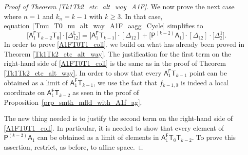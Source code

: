 \documentclass[pdftex]{sigma}
\numberwithin{equation}{section}
\begin{document}
\begin{proof}[Proof of Theorem \ref{Tk1Tk2_etc_alt_way_A1F}]
We now prove
the next case where $n = 1$ and $k_n = k-1$ with $k \geq 3$.
In that case, equation~\eqref{Tmu_T0_nu_alt_way_A1F_aagg_Cycle}
simplifies to
\begin{equation}\label{A1FT0T1_coll}
\bigl[\mathsf{A}_1^{\mathsf{F}} \mathsf{T}_{k-2}\mathsf{T}_{0}\bigr]
\cdot \bigl[\Delta_{12}^{\mathsf{L}}\bigr]
 =  \bigl[\mathsf{A}_1^{\mathsf{F}} \mathsf{T}_{k-1}\bigr]\cdot [\Delta_{12}] +
\bigl[\mathsf{P}^{(k-2)}\mathsf{A}_1\bigr]\cdot [\Delta_{12}] \cdot \bigl[\Delta_{2}^1\bigr].
\end{equation}
In order to prove \eqref{A1FT0T1_coll}, we
build on what has already been proved in Theorem \ref{Tk1Tk2_etc_alt_way}.
The justification for the first term on the right-hand side of
\eqref{A1FT0T1_coll} is the same as in the proof of Theorem \ref{Tk1Tk2_etc_alt_way}.
In order to show that every $\mathsf{A}_1^{\mathsf{F}}\mathsf{T}_{k-1}$ point can be
obtained as a limit of
$\mathsf{A}_1^{\mathsf{F}}\mathsf{T}_{k-1}$, we use the fact that
$f_{k-1, 0}$ is indeed a local coordinate on
$\mathsf{A}_1^{\mathsf{F}} \overline{\mathsf{T}}_{k-2}$ as seen in the proof of Proposition~\ref{prp_smth_mfld_with_A1f_ag}.

The new thing needed is to justify the second term on the right-hand side of \eqref{A1FT0T1_coll}.
In particular, it is needed to show that
every element of
$\mathsf{P}^{(k-2)}\mathsf{A}_1$ can be obtained as a limit of elements
in $\mathsf{A}_1^{\mathsf{F}} \mathsf{T}_{0}\mathsf{T}_{k-2}$. To prove this assertion,
restrict, as before, to affine space.


\end{proof}
\end{document}
